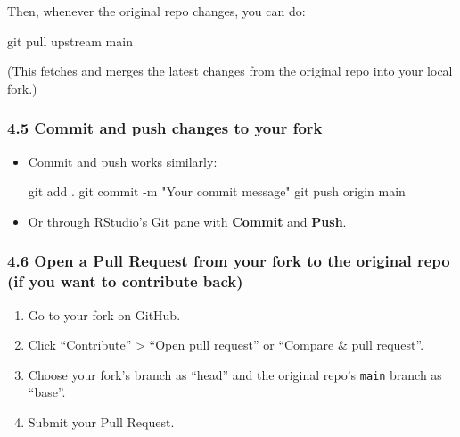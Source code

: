 \documentclass[
  letterpaper,
  DIV=11,
  numbers=noendperiod]{scrartcl}
\newenvironment{Shaded}{\begin{snugshade}}{\end{snugshade}}
\newcommand{\AttributeTok}[1]{\textcolor[rgb]{0.40,0.45,0.13}{#1}}
\newcommand{\FunctionTok}[1]{\textcolor[rgb]{0.28,0.35,0.67}{#1}}
\newcommand{\NormalTok}[1]{\textcolor[rgb]{0.00,0.23,0.31}{#1}}
\newcommand{\StringTok}[1]{\textcolor[rgb]{0.13,0.47,0.30}{#1}}
\providecommand{\tightlist}{%
  \setlength{\itemsep}{0pt}\setlength{\parskip}{0pt}}\usepackage{longtable,booktabs,array}
\begin{document}
Then, whenever the original repo changes, you can do:

\begin{Shaded}
\begin{Highlighting}[]
\FunctionTok{git}\NormalTok{ pull upstream main}
\end{Highlighting}
\end{Shaded}

(This fetches and merges the latest changes from the original repo into
your local fork.)

\subsubsection{4.5 Commit and push changes to your
fork}\label{commit-and-push-changes-to-your-fork}

\begin{itemize}
\item
  Commit and push works similarly:

\begin{Shaded}
\begin{Highlighting}[]
\FunctionTok{git}\NormalTok{ add .}
\FunctionTok{git}\NormalTok{ commit }\AttributeTok{{-}m} \StringTok{"Your commit message"}
\FunctionTok{git}\NormalTok{ push origin main}
\end{Highlighting}
\end{Shaded}
\item
  Or through RStudio's Git pane with \textbf{Commit} and \textbf{Push}.
\end{itemize}

\subsubsection{4.6 Open a Pull Request from your fork to the original
repo (if you want to contribute
back)}\label{open-a-pull-request-from-your-fork-to-the-original-repo-if-you-want-to-contribute-back}

\begin{enumerate}
\def\labelenumi{\arabic{enumi}.}
\tightlist
\item
  Go to your fork on GitHub.\\
\item
  Click ``Contribute'' \textgreater{} ``Open pull request'' or ``Compare
  \& pull request''.\\
\item
  Choose your fork's branch as ``head'' and the original repo's
  \texttt{main} branch as ``base''.\\
\item
  Submit your Pull Request.
\end{enumerate}
\end{document}
